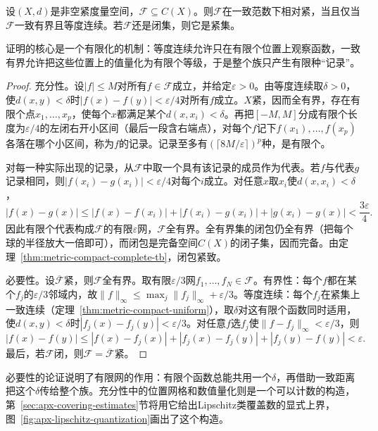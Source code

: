 \begin{theorem}
\label{thm:apx-arzela-ascoli}
设$(X,d)$是非空紧度量空间，$\mathcal F\subseteq C(X)$。则$\mathcal F$在一致范数下相对紧，当且仅当$\mathcal F$一致有界且等度连续。若$\mathcal F$还是闭集，则它是紧集。
\end{theorem}

证明的核心是一个有限化的机制：等度连续允许只在有限个位置上观察函数，一致有界允许把这些位置上的值量化为有限个等级，于是整个族只产生有限种“记录”。

\begin{proof}
充分性。设$|f|\le M$对所有$f\in\mathcal F$成立，并给定$\varepsilon>0$。由等度连续取$\delta>0$，使$d(x,y)<\delta$时$|f(x)-f(y)|<\varepsilon/4$对所有$f$成立。$X$紧，因而全有界，存在有限个点$x_1,\ldots,x_p$，使每个$x$都满足某个$d(x,x_i)<\delta$。再把$[-M,M]$分成有限个长度为$\varepsilon/4$的左闭右开小区间（最后一段含右端点），对每个$f$记下$f(x_1),\ldots,f(x_p)$各落在哪个小区间，称为$f$的记录。记录至多有$(\lceil8M/\varepsilon\rceil)^p$种，是有限个。

对每一种实际出现的记录，从$\mathcal F$中取一个具有该记录的成员作为代表。若$f$与代表$g$记录相同，则$|f(x_i)-g(x_i)|<\varepsilon/4$对每个$i$成立。对任意$x$取$x_i$使$d(x,x_i)<\delta$，
\[
  |f(x)-g(x)|\le|f(x)-f(x_i)|+|f(x_i)-g(x_i)|+|g(x_i)-g(x)|<\frac{3\varepsilon}4 .
\]
因此有限个代表构成$\mathcal F$的有限$\varepsilon$网，$\mathcal F$全有界。全有界集的闭包仍全有界（把每个球的半径放大一倍即可），而闭包是完备空间$C(X)$的闭子集，因而完备。由定理~\ref{thm:metric-compact-complete-tb}，闭包紧致。

必要性。设$\overline{\mathcal F}$紧，则$\mathcal F$全有界。取有限$\varepsilon/3$网$f_1,\ldots,f_N\in\mathcal F$。有界性：每个$f$都在某个$f_j$的$\varepsilon/3$邻域内，故$\|f\|_\infty\le\max_j\|f_j\|_\infty+\varepsilon/3$。等度连续：每个$f_j$在紧集上一致连续（定理~\ref{thm:metric-compact-uniform}），取$\delta$对这有限个函数同时适用，使$d(x,y)<\delta$时$|f_j(x)-f_j(y)|<\varepsilon/3$。对任意$f$选$f_j$使$\|f-f_j\|_\infty<\varepsilon/3$，则
\[
  |f(x)-f(y)|\le|f(x)-f_j(x)|+|f_j(x)-f_j(y)|+|f_j(y)-f(y)|<\varepsilon .
\]
最后，若$\mathcal F$闭，则$\mathcal F=\overline{\mathcal F}$紧。
\end{proof}

必要性的论证说明了有限网的作用：有限个函数总能共用一个$\delta$，再借助一致距离把这个$\delta$传给整个族。充分性中的位置网格和数值量化则是一个可以计数的构造，第~\ref{sec:apx-covering-estimates}节将用它给出Lipschitz类覆盖数的显式上界，图~\ref{fig:apx-lipschitz-quantization}画出了这个构造。

